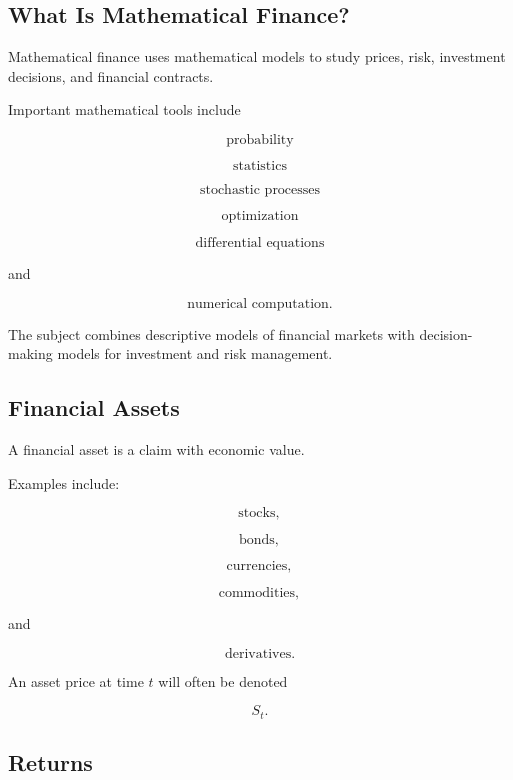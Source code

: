 \subsection{What Is Mathematical Finance?}
\label{subsec:what-is-mathematical-finance}

Mathematical finance uses mathematical models to study prices, risk,
investment decisions, and financial contracts.

Important mathematical tools include

\[
\boxed{
\text{probability}
}
\]

\[
\boxed{
\text{statistics}
}
\]

\[
\boxed{
\text{stochastic processes}
}
\]

\[
\boxed{
\text{optimization}
}
\]

\[
\boxed{
\text{differential equations}
}
\]

and

\[
\boxed{
\text{numerical computation}.
}
\]

The subject combines descriptive models of financial markets with
decision-making models for investment and risk management.

\subsection{Financial Assets}
\label{subsec:financial-assets}

A financial asset is a claim with economic value.

Examples include:

\[
\boxed{
\text{stocks},
}
\]

\[
\boxed{
\text{bonds},
}
\]

\[
\boxed{
\text{currencies},
}
\]

\[
\boxed{
\text{commodities},
}
\]

and

\[
\boxed{
\text{derivatives}.
}
\]

An asset price at time \(t\) will often be denoted

\[
\boxed{
S_t.
}
\]

\subsection{Returns}
\label{subsec:financial-returns}

